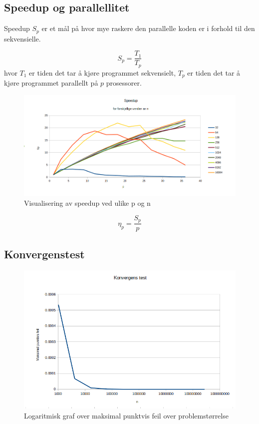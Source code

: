 \documentclass[11pt,norsk,a4paper]{article}
\begin{document}
\subsection{Speedup og parallellitet}
Speedup $S_p$ er et mål på hvor mye raskere den parallelle koden er i forhold til den sekvensielle. 

$$ S_p = \frac{T_1}{T_p}$$
    hvor $T_1$ er tiden det tar å kjøre programmet sekvensielt, $T_p$ er tiden det tar å kjøre programmet parallellt på $p$ prosessorer. 

\begin{figure}[h]
\centering
\includegraphics[scale=0.5]{plot_speedup.png}
\caption{Visualisering av speedup ved ulike p og n}
\end{figure}


$$ \eta_p = \frac{S_p}{p}$$

\subsection{Konvergenstest}

\begin{figure}[h]
\centering
\includegraphics[scale=0.5]{plot_konvergens.png}
\caption{Logaritmisk graf over maksimal punktvis feil over problemstørrelse}
\end{figure}
\end{document}
